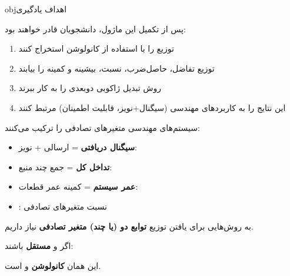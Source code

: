 \begin{PSbox}[unbreakable]{obj}{اهداف یادگیری}

پس از تکمیل این ماژول، دانشجویان قادر خواهند بود:

\begin{enumerate}
\def\labelenumi{\arabic{enumi}.}
\tightlist
\item
  توزیع  را با استفاده از کانولوشن استخراج کنند
\item
  توزیع تفاضل، حاصل‌ضرب، نسبت، بیشینه و کمینه را بیابند
\item
  روش تبدیل ژاکوبی دوبعدی را به کار ببرند
\item
  این نتایج را به کاربردهای مهندسی (سیگنال+نویز، قابلیت اطمینان) مرتبط کنند
\end{enumerate}

\end{PSbox}


سیستم‌های مهندسی متغیرهای تصادفی را ترکیب می‌کنند:

\begin{itemize}
\tightlist
\item
  \textbf{سیگنال دریافتی} = ارسالی + نویز: 
\item
  \textbf{تداخل کل} = جمع چند منبع: 
\item
  \textbf{عمر سیستم} = کمینه عمر قطعات: 
\item
  : نسبت متغیرهای تصادفی
\end{itemize}

به روش‌هایی برای یافتن توزیع \textbf{توابع دو (یا چند) متغیر تصادفی} نیاز داریم.





اگر  و  \textbf{مستقل} باشند:


این همان \textbf{کانولوشن}  و  است.


